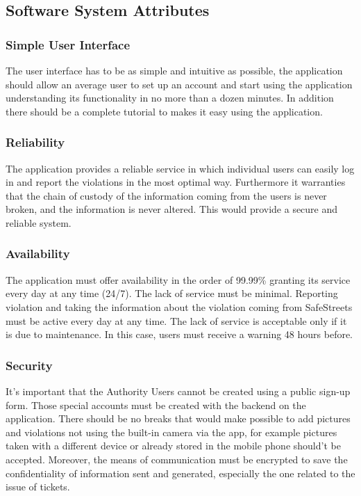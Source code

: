 \subsection{Software System Attributes}
\subsubsection{Simple User Interface}
The user interface has to be as simple and intuitive as possible, the application should allow an average user to set up an account and start using the application understanding its functionality in no more than a dozen minutes. In addition there should be a complete tutorial to makes it easy using the application.

\subsubsection{Reliability}
The application provides a reliable service in which individual users can easily log in and report the violations in the most optimal way. Furthermore it warranties that the chain of custody of the information coming from the users is never broken, and the information is never altered. This would provide a secure and reliable system.

\subsubsection{Availability}
The application must offer availability in the order of 99.99\% granting its service every day at any time (24/7). The lack of service must be minimal. Reporting violation and taking the information about the violation coming from SafeStreets must be active every day at any time. The lack of service is acceptable only if it is due to maintenance. In this case, users must receive a warning 48 hours before.
\subsubsection{Security}
It's important that the Authority Users cannot be created using a public sign-up form. Those special accounts must be created with the backend on the application.
There should be no breaks that would make possible to add pictures and violations not using the built-in camera via the app, for example pictures taken with a different device or already stored in the mobile phone should't be accepted. Moreover, the means of communication must be encrypted to save the confidentiality of information sent and generated, especially the one related to the issue of tickets.

